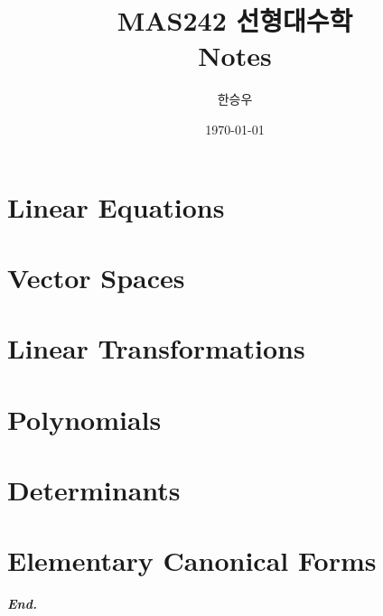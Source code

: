 \documentclass[a4paper,12pt]{report}
\title{\Huge{MAS242 선형대수학\\Notes}}
\author{\huge{한승우}}
\date{\today}
\begin{document}
\maketitle
\newpage
{}
\tikzexternaldisable
\tableofcontents
\tikzexternalenable
\pagebreak

\chapter{Linear Equations}

\chapter{Vector Spaces}
 
\chapter{Linear Transformations}
 
\chapter{Polynomials}
 
\chapter{Determinants}
 
\chapter{Elementary Canonical Forms}
 
\vfill
\begin{center}
    \textbf{\textit{End.}}
\end{center}
\end{document}
